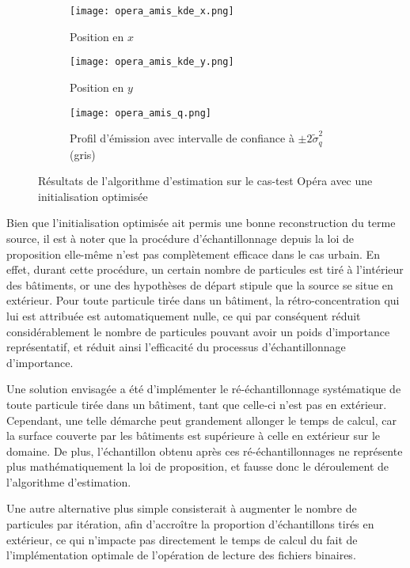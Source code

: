 \begin{figure}[h!]
	\centering
	\begin{subfigure}[t]{0.5\textwidth}
		\centering
		\texttt{[image: opera\_amis\_kde\_x.png]}
		\caption{Position en $x$}
		\label{opera_amis_x}
	\end{subfigure}%
	\begin{subfigure}[t]{0.5\textwidth}
		\centering
		\texttt{[image: opera\_amis\_kde\_y.png]}
		\caption{Position en $y$}
		\label{opera_amis_y}
	\end{subfigure}
	\begin{subfigure}[t]{0.65\textwidth}
		\centering
		\texttt{[image: opera\_amis\_q.png]}
		\caption{Profil d'émission avec intervalle de confiance à  $\pm 2 \widetilde{\sigma}_q^2$ (gris)}
		\label{opera_amis_q}
	\end{subfigure} 
	\caption{Résultats de l'algorithme d'estimation sur le cas-test Opéra avec une initialisation optimisée}
	\label{fig_opera_amis}
\end{figure}

Bien que l'initialisation optimisée ait permis une bonne reconstruction du terme source, il est à noter que la procédure d'échantillonnage depuis la loi de proposition elle-même n'est pas complètement efficace dans le cas urbain. En effet, durant cette procédure, un certain nombre de particules est tiré à l'intérieur des bâtiments, or une des hypothèses de départ stipule que la source se situe en extérieur. Pour toute particule tirée dans un bâtiment, la rétro-concentration qui lui est attribuée est automatiquement nulle, ce qui par conséquent réduit considérablement le nombre de particules pouvant avoir un poids d'importance représentatif, et réduit ainsi l'efficacité du processus d'échantillonnage d'importance. 

Une solution envisagée a été d'implémenter le ré-échantillonnage systématique de toute particule tirée dans un bâtiment, tant que celle-ci n'est pas en extérieur. Cependant, une telle démarche peut grandement allonger le temps de calcul, car la surface couverte par les bâtiments est supérieure à celle en extérieur sur le domaine. De plus, l'échantillon obtenu après ces ré-échantillonnages ne représente plus mathématiquement la loi de proposition, et fausse donc le déroulement de l'algorithme d'estimation. 

Une autre alternative plus simple consisterait à augmenter le nombre de particules par itération, afin d'accroître la proportion d'échantillons tirés en extérieur, ce qui n'impacte pas directement le temps de calcul du fait de l'implémentation optimale de l'opération de lecture des fichiers binaires. 


